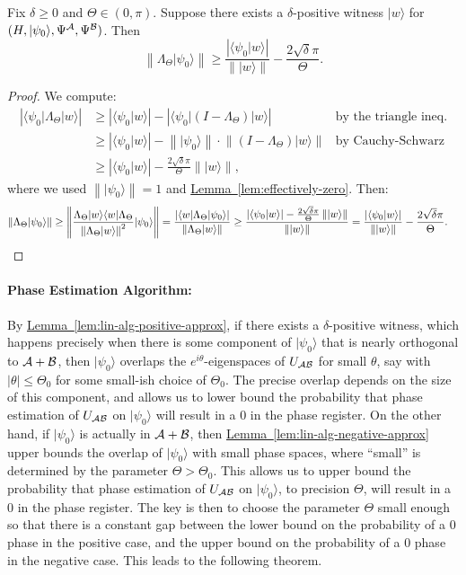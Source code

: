 \documentclass{theoretics}
\newcommand{\lem}[1]{\hyperref[lem:#1]{Lemma~\ref*{lem:#1}}}
\def\ket#1{{\lvert}#1\rangle}
\def\bra#1{{\langle}#1\rvert}
\renewcommand{\>}{\rangle}
\newcommand{\<}{\langle}
\renewcommand{\(}{\left(}
\renewcommand{\)}{\right)}
\def\braket#1#2{{{\langle}#1\vert}#2\rangle}
\def\norm#1{\left\| #1 \right\|}
\begin{document}
\begin{lemma} \label{lem:lin-alg-positive-approx}
Fix $\delta\geq 0$ and $\Theta\in (0,\pi)$.
Suppose there exists a $\delta$-positive witness $\ket{w}$ for $(H,\ket{\psi_0},\Psi^{\cal A},\Psi^{\cal B})$. Then
\begin{equation*}
\norm{\Lambda_\Theta\ket{\psi_0}} \geq \frac{|\braket{\psi_0}{w}|}{\norm{\ket{w}}} - \frac{2\sqrt{\delta}\pi}{\Theta}.
\end{equation*}
\end{lemma}
\begin{proof}
We compute:
\begin{align*}
|\bra{\psi_0}\Lambda_\Theta\ket{w}| &\geq |\braket{\psi_0}{w}| - |\bra{\psi_0}(I-\Lambda_\Theta)\ket{w}| & \mbox{by the triangle ineq.}\\
&\geq |\braket{\psi_0}{w}| - \norm{\ket{\psi_0}}\cdot\norm{(I-\Lambda_\Theta)\ket{w}} & \mbox{by Cauchy-Schwarz}\\
&\geq |\braket{\psi_0}{w}| - \frac{2\sqrt{\delta}\pi}{\Theta}\norm{\ket{w}},
\end{align*}
where we used $\norm{\ket{\psi_0}}=1$ and \lem{effectively-zero}.
Then:
\begin{align*}
\norm{\Lambda_\Theta\ket{\psi_0}} &\geq \norm{\frac{\Lambda_\Theta\ket{w}\bra{w}\Lambda_\Theta}{\norm{\Lambda_\Theta\ket{w}}^2}\ket{\psi_0}}
= \frac{|\bra{w}\Lambda_\Theta\ket{\psi_0}|}{\norm{\Lambda_\Theta\ket{w}}}
\geq \frac{|\braket{\psi_0}{w}|-\frac{2\sqrt{\delta}\pi}{\Theta}\norm{\ket{w}}}{\norm{\ket{w}}}
= \frac{|\braket{\psi_0}{w}|}{\norm{\ket{w}}} - \frac{2\sqrt{\delta}\pi}{\Theta}.\qedhere
\end{align*}
\end{proof}

\paragraph{Phase Estimation Algorithm:}

By \lem{lin-alg-positive-approx}, if there exists a $\delta$-positive witness, which happens precisely when there is some component of $\ket{\psi_0}$ that is nearly orthogonal to ${\cal A}+{\cal B}$, then $\ket{\psi_0}$ overlaps the $e^{i\theta}$-eigenspaces of $U_{\cal AB}$ for small $\theta$, say with $|\theta|\leq \Theta_0$ for some small-ish choice of $\Theta_0$. The precise overlap depends on the size of this component, and allows us to lower bound the probability that phase estimation of $U_{\cal AB}$ on $\ket{\psi_0}$ will result in a 0 in the phase register. On the other hand, if $\ket{\psi_0}$ is actually in ${\cal A}+{\cal B}$, then \lem{lin-alg-negative-approx} upper bounds the overlap of $\ket{\psi_0}$ with small phase spaces, where ``small'' is determined by the parameter $\Theta>\Theta_0$. This allows us to upper bound the probability that phase estimation of $U_{\cal AB}$ on $\ket{\psi_0}$, to precision $\Theta$, will result in a 0 in the phase register. The key is then to choose the parameter $\Theta$ small enough so that there is a constant gap between the lower bound on the probability of a 0 phase in the positive case, and the upper bound on the probability of a 0 phase in the negative case. This leads to the following theorem.
\end{document}
